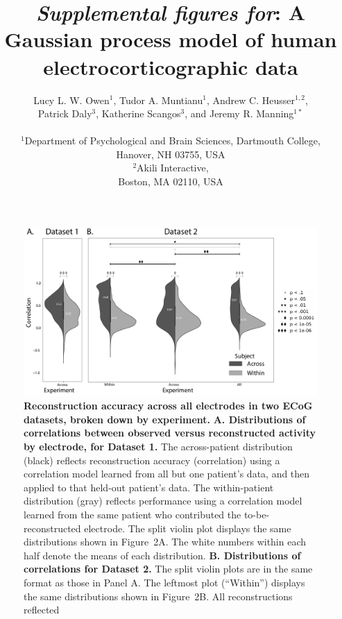 \documentclass[11pt]{article}
\title{\textit{Supplemental figures for}: A Gaussian process model of human electrocorticographic data}
\author{
  Lucy L. W. Owen$^{1}$,
  Tudor A. Muntianu$^{1}$,
  Andrew C. Heusser$^{1, 2}$, \\
  Patrick Daly$^{3}$,
  Katherine Scangos$^{3}$, and
  Jeremy R. Manning$^{1\ast}$\\\\
$^{1}$Department of Psychological and Brain Sciences, Dartmouth College,\\
Hanover, NH 03755, USA\\
$^{2}$Akili Interactive,\\
Boston, MA 02110, USA}
\begin{document}
\setcounter{equation}{0}
\setcounter{figure}{0}
\setcounter{table}{0}
\setcounter{page}{1}
\setcounter{section}{0}
\makeatletter
\renewcommand{\theequation}{S\arabic{equation}}
\renewcommand{\thefigure}{S\arabic{figure}}

\newcommand{\methods}{1}
\newcommand{\corrmaps}{2}
\newcommand{\freqs}{3}
\newcommand{\density}{4}
\newcommand{\infomap}{5}
\newcommand{\infomapfreqs}{6}

\begin{titlepage}
  \maketitle
\end{titlepage}

\begin{figure}[p]
\centering \includegraphics[width=\textwidth]{figs/supplemental_1}
\caption{\textbf{Reconstruction accuracy across all electrodes in two ECoG
datasets, broken down by experiment.} \textbf{A. Distributions of correlations
between observed versus reconstructed activity by electrode, for Dataset 1.}
The across-patient distribution (black) reflects reconstruction accuracy
(correlation) using a correlation model learned from all but one patient's data,
and then applied to that held-out patient's data. The within-patient
distribution (gray) reflects performance using a correlation model learned from
the same patient who contributed the to-be-reconstructed electrode.  The split
violin plot displays the same distributions shown in Figure~\corrmaps A.  The
white numbers within each half denote the means of each distribution. \textbf{B.
Distributions of correlations for Dataset 2.}  The split violin plots are in the
same format as those in Panel A.  The leftmost plot (``Within'') displays the
same distributions shown in Figure~\corrmaps B.  All reconstructions reflected
}
\end{figure}
\end{document}
